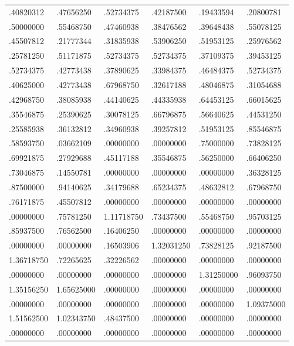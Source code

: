 \documentclass[11pt]{article}
\theoremstyle{definition}
\theoremstyle{remark}
\begin{document}
\begin{longtable}{llllll}
.40820312 & .47656250 & .52734375 & .42187500 & .19433594 & .20800781 \\
.50000000 & .55468750 & .47460938 & .38476562 & .39648438 & .55078125 \\
.45507812 & .21777344 & .31835938 & .53906250 & .51953125 & .25976562 \\
.25781250 & .51171875 & .52734375 & .52734375 & .37109375 & .39453125 \\
.52734375 & .42773438 & .37890625 & .33984375 & .46484375 & .52734375 \\
.40625000 & .42773438 & .67968750 & .32617188 & .48046875 & .31054688 \\
.42968750 & .38085938 & .44140625 & .44335938 & .64453125 & .66015625 \\
.35546875 & .25390625 & .30078125 & .66796875 & .56640625 & .44531250 \\
.25585938 & .36132812 & .34960938 & .39257812 & .51953125 & .85546875 \\
.58593750 & .03662109 & .00000000 & .00000000 & .75000000 & .73828125 \\
.69921875 & .27929688 & .45117188 & .35546875 & .56250000 & .66406250 \\
.73046875 & .14550781 & .00000000 & .00000000 & .00000000 & .36328125 \\
.87500000 & .94140625 & .34179688 & .65234375 & .48632812 & .67968750 \\
.76171875 & .45507812 & .00000000 & .00000000 & .00000000 & .00000000 \\
.00000000 & .75781250 & 1.11718750 & .73437500 & .55468750 & .95703125 \\
.85937500 & .76562500 & .16406250 & .00000000 & .00000000 & .00000000 \\
.00000000 & .00000000 & .16503906 & 1.32031250 & .73828125 & .92187500 \\
1.36718750 & .72265625 & .32226562 & .00000000 & .00000000 & .00000000 \\
.00000000 & .00000000 & .00000000 & .00000000 & 1.31250000 & .96093750 \\
1.35156250 & 1.65625000 & .00000000 & .00000000 & .00000000 & .00000000 \\
.00000000 & .00000000 & .00000000 & .00000000 & .00000000 & 1.09375000 \\
1.51562500 & 1.02343750 & .48437500 & .00000000 & .00000000 & .00000000 \\
.00000000 & .00000000 & .00000000 & .00000000 & .00000000 & .00000000 \\

\end{longtable}
\end{document}
